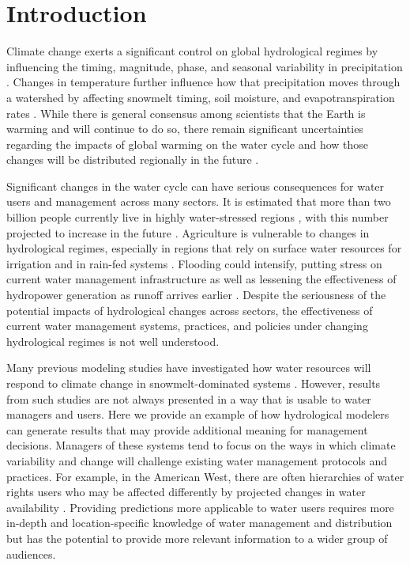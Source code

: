 \documentclass[water,article,submit,moreauthors,pdftex,10pt,a4paper]{mdpi}
\theoremstyle{mdpi}
\newcounter{ex}
\newcounter{re}
\theoremstyle{mdpidefinition}
\begin{document}


\section{Introduction}
Climate change exerts a significant control on global hydrological regimes by influencing the timing, magnitude, phase, and seasonal variability in precipitation \citep{Mote:2005bv,Regonda:2005bl,Knowles:2006jc,Haddeland:2014kx,Deb:2018tj}. Changes in temperature further influence how that precipitation moves through a watershed by affecting snowmelt timing, soil moisture, and evapotranspiration rates \citep{Barnett:2005ci,Li:2017jn}. While there is general consensus among scientists that the Earth is warming and will continue to do so, there remain significant uncertainties regarding the impacts of global warming on the water cycle and how those changes will be distributed regionally in the future \citep{Huntington:2006tl,Turral:2011uj}.

Significant changes in the water cycle can have serious consequences for water users and management across many sectors. It is estimated that more than two billion people currently live in highly water-stressed regions \citep{Oki:2006cu}, with this number projected to increase in the future \citep{Schewe:2014er}. Agriculture is vulnerable to changes in hydrological regimes, especially in regions that rely on surface water resources for irrigation and in rain-fed systems \citep{Turral:2011uj}. Flooding could intensify, putting stress on current water management infrastructure as well as lessening the effectiveness of hydropower generation as runoff arrives earlier \citep{Markoff:2008tk}. Despite the seriousness of the potential impacts of hydrological changes across sectors, the effectiveness of current water management systems, practices, and policies under changing hydrological regimes is not well understood.

Many previous modeling studies have investigated how water resources will respond to climate change in snowmelt-dominated systems \citep{Adam:2009ie, Jin:2011ii, Ficklin:2013js, Gergel:2017vj}. However, results from such studies are not always presented in a way that is usable to water managers and users. Here we provide an example of how hydrological modelers can generate results that may provide additional meaning for management decisions. Managers of these systems tend to focus on the ways in which climate variability and change will challenge existing water management protocols and practices. For example, in the American West, there are often hierarchies of water rights users who may be affected differently by projected changes in water availability \citep{Vicuna:2007gj}. Providing predictions more applicable to water users requires more in-depth and location-specific knowledge of water management and distribution but has the potential to provide more relevant information to a wider group of audiences. 
\end{document}
